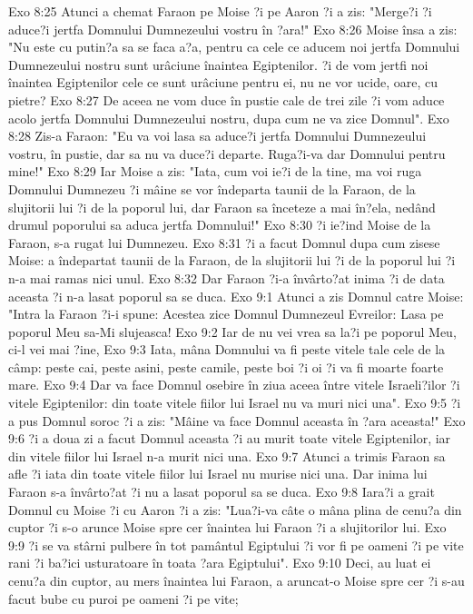 Exo 8:25  Atunci a chemat Faraon pe Moise ?i pe Aaron ?i a zis: "Merge?i ?i aduce?i jertfa Domnului Dumnezeului vostru în ?ara!"
Exo 8:26  Moise însa a zis: "Nu este cu putin?a sa se faca a?a, pentru ca cele ce aducem noi jertfa Domnului Dumnezeului nostru sunt urâciune înaintea Egiptenilor. ?i de vom jertfi noi înaintea Egiptenilor cele ce sunt urâciune pentru ei, nu ne vor ucide, oare, cu pietre?
Exo 8:27  De aceea ne vom duce în pustie cale de trei zile ?i vom aduce acolo jertfa Domnului Dumnezeului nostru, dupa cum ne va zice Domnul".
Exo 8:28  Zis-a Faraon: "Eu va voi lasa sa aduce?i jertfa Domnului Dumnezeului vostru, în pustie, dar sa nu va duce?i departe. Ruga?i-va dar Domnului pentru mine!"
Exo 8:29  Iar Moise a zis: "Iata, cum voi ie?i de la tine, ma voi ruga Domnului Dumnezeu ?i mâine se vor îndeparta taunii de la Faraon, de la slujitorii lui ?i de la poporul lui, dar Faraon sa înceteze a mai în?ela, nedând drumul poporului sa aduca jertfa Domnului!"
Exo 8:30  ?i ie?ind Moise de la Faraon, s-a rugat lui Dumnezeu.
Exo 8:31  ?i a facut Domnul dupa cum zisese Moise: a îndepartat taunii de la Faraon, de la slujitorii lui ?i de la poporul lui ?i n-a mai ramas nici unul.
Exo 8:32  Dar Faraon ?i-a învârto?at inima ?i de data aceasta ?i n-a lasat poporul sa se duca.
Exo 9:1  Atunci a zis Domnul catre Moise: "Intra la Faraon ?i-i spune: Acestea zice Domnul Dumnezeul Evreilor: Lasa pe poporul Meu sa-Mi slujeasca!
Exo 9:2  Iar de nu vei vrea sa la?i pe poporul Meu, ci-l vei mai ?ine,
Exo 9:3  Iata, mâna Domnului va fi peste vitele tale cele de la câmp: peste cai, peste asini, peste camile, peste boi ?i oi ?i va fi moarte foarte mare.
Exo 9:4  Dar va face Domnul osebire în ziua aceea între vitele Israeli?ilor ?i vitele Egiptenilor: din toate vitele fiilor lui Israel nu va muri nici una".
Exo 9:5  ?i a pus Domnul soroc ?i a zis: "Mâine va face Domnul aceasta în ?ara aceasta!"
Exo 9:6  ?i a doua zi a facut Domnul aceasta ?i au murit toate vitele Egiptenilor, iar din vitele fiilor lui Israel n-a murit nici una.
Exo 9:7  Atunci a trimis Faraon sa afle ?i iata din toate vitele fiilor lui Israel nu murise nici una. Dar inima lui Faraon s-a învârto?at ?i nu a lasat poporul sa se duca.
Exo 9:8  Iara?i a grait Domnul cu Moise ?i cu Aaron ?i a zis: "Lua?i-va câte o mâna plina de cenu?a din cuptor ?i s-o arunce Moise spre cer înaintea lui Faraon ?i a slujitorilor lui.
Exo 9:9  ?i se va stârni pulbere în tot pamântul Egiptului ?i vor fi pe oameni ?i pe vite rani ?i ba?ici usturatoare în toata ?ara Egiptului".
Exo 9:10  Deci, au luat ei cenu?a din cuptor, au mers înaintea lui Faraon, a aruncat-o Moise spre cer ?i s-au facut bube cu puroi pe oameni ?i pe vite;
